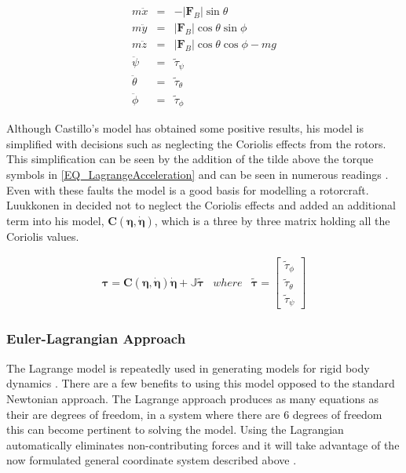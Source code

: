 		\begin{eqnarray}
		\label{EQ_LagrangeAcceleration}
		m\ddot{x} &=& -\lvert \textbf{F}_B \rvert\sin\theta\\
		m\ddot{y} &=& \lvert \textbf{F}_B \rvert\cos\theta\sin\phi\\
		m\ddot{z} &=& \lvert \textbf{F}_B \rvert\cos\theta\cos\phi - mg\\
		\ddot{\psi} &=& \tilde{\tau}_\psi\\
		\ddot{\theta} &=& \tilde{\tau}_\theta\\
		\ddot{\phi} &=& \tilde{\tau}_\phi
		\end{eqnarray}
		
		Although Castillo's model has obtained some positive results, his model is simplified with decisions such as neglecting the Coriolis effects from the rotors. This simplification can be seen by the addition of the tilde above the torque symbols in \ref{EQ_LagrangeAcceleration} and  can be seen in numerous readings \cite{MiniFlying, RealTime, Modelling}. Even with these faults the model is a good basis for modelling a rotorcraft. Luukkonen in \cite{Luukkonen} decided not to neglect the Coriolis effects and added an additional term into his model, $\textbf{C}(\boldsymbol{\eta}, \dot{\boldsymbol{\eta}})$, which is a three by three matrix holding all the Coriolis values. 
		
		\begin{eqnarray}
		\label{EQ_LagrangeAccelerationCoriolis}
		\boldsymbol{\tau} = \textbf{C}(\boldsymbol{\eta}, \dot{\boldsymbol{\eta}})\dot{\boldsymbol{\eta}} + \mathbb{J}\tilde{\boldsymbol{\tau}} & where & \tilde{\boldsymbol{\tau}} = \begin{bmatrix}
		\tilde{\tau}_\phi\\
		\tilde{\tau}_\theta\\
		\tilde{\tau}_\psi
		\end{bmatrix}
		\end{eqnarray}
		
		
		\subsubsection{Euler-Lagrangian Approach}
		The Lagrange model is repeatedly used in generating models for rigid body dynamics \cite{MIT, MiniFlying, Luukkonen, RealTime}. There are a few benefits to using this model opposed to the standard Newtonian approach. The Lagrange approach produces as many equations as their are degrees of freedom, in a system where there are 6 degrees of freedom this can become pertinent to solving the model. Using the Lagrangian automatically eliminates non-contributing forces and it will take advantage of the now formulated general coordinate system described above \cite{MIT}.
		
